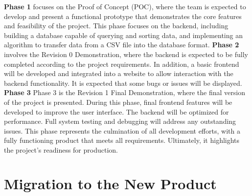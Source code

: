 \documentclass[12pt]{article}
\begin{document}
\noindent\textbf{Phase 1} focuses on the Proof of Concept (POC), where the team
is expected to develop and present a functional prototype that demonstrates the
core features and feasibility of the project. This phase focuses on the backend,
including building a database capable of querying and sorting data, and
implementing an algorithm to transfer data from a CSV file into the database
format.\newline\newline
\noindent\textbf{Phase 2} involves the Revision 0 Demonstration, where the
backend is expected to be fully completed according to the project requirements.
In addition, a basic frontend will be developed and integrated into a website to
allow interaction with the backend functionality. It is expected that some bugs
or issues will be displayed. \newline\newline
\noindent\textbf{Phase 3} Phase 3 is the Revision 1 Final Demonstration, where
the final version of the project is presented. During this phase, final frontend
features will be developed to improve the user interface. The backend will be
optimized for performance. Full system testing and debugging will address any
outstanding issues.  This phase represents the culmination of all development
efforts, with a fully functioning product that meets all requirements.
Ultimately, it highlights the project's readiness for production.


\section{Migration to the New Product}
\end{document}
